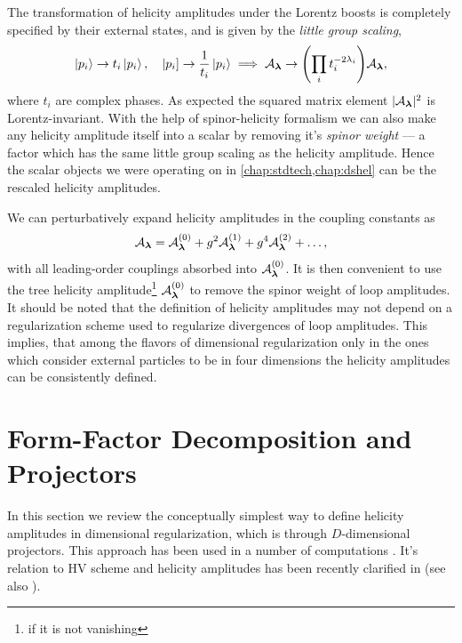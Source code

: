The transformation of helicity amplitudes under the Lorentz boosts is completely specified by their 
external states, and is given by the \emph{little group scaling},
\begin{equation}
  \ket{p_i} \to t_i \ket{p_i}, \quad  \left\vert p_i \right] \to \frac{1}{t_i} \ket{p_i} \implies \mathcal{A}_{\vb*{\lambda}} \to  \qty(\prod_i t_i^{-2\lambda_i}) \mathcal{A}_{\vb*{\lambda}},
\end{equation}
where $t_i$ are complex phases.
As expected the squared matrix element $\vert \mathcal{A}_{\vb*{\lambda}}{} \vert^2$ is Lorentz-invariant.
With the help of spinor-helicity formalism we can also make any helicity amplitude itself into a scalar
by removing it's \emph{spinor weight} --- a factor which has the same little group scaling
as the helicity amplitude.
Hence the scalar objects we were operating on in \cref{chap:stdtech,chap:dshel} can be the rescaled helicity amplitudes.

We can perturbatively expand helicity amplitudes in the coupling constants as
\begin{equation}
  \mathcal{A}_{\vb*{\lambda}} =  \mathcal{A}_{\vb*{\lambda}}^{(0)} + g^2 \mathcal{A}_{\vb*{\lambda}}^{(1)} + g^4 \mathcal{A}_{\vb*{\lambda}}^{(2)} + \ldots{},
\end{equation}
with all leading-order couplings absorbed into $\mathcal{A}_{\vb*{\lambda}}^{(0)}$.
It is then convenient to use the tree helicity amplitude\footnote{if it is not vanishing} $\mathcal{A}_{\vb*{\lambda}} ^{(0)}$ to remove the spinor weight
of loop amplitudes.
It should be noted that the definition of helicity amplitudes may not depend on a regularization scheme
used to regularize divergences of loop amplitudes. This implies, that 
among the flavors of dimensional regularization only in the ones which consider external particles 
to be in four dimensions the helicity amplitudes can be consistently defined.


\section{Form-Factor Decomposition and Projectors}
\label{sec:helampl_projectors}

In this section we review the conceptually simplest way to define helicity amplitudes in dimensional regularization, which is through $D$-dimensional projectors.
This approach has been used in a number of computations \cite{Garland:2002ak, Moch:2002hm, Glover:2003cm, Glover:2004si,Gehrmann:2009vu,Gehrmann:2011aa}.
It's relation to HV scheme and helicity amplitudes has been recently clarified in \cite{Peraro:2019cjj} (see also \cite{Chen:2019wyb}).

